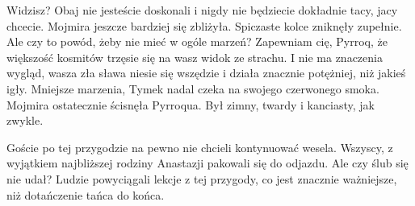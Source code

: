 \ds{} Widzisz? Obaj nie jesteście doskonali i nigdy nie będziecie dokładnie tacy, jacy chcecie. \dm{} Mojmira jeszcze bardziej się zbliżyła.
Spiczaste kolce zniknęły zupełnie. \dm{} Ale czy to powód, żeby nie mieć w ogóle marzeń?
Zapewniam cię, Pyrroq, że większość kosmitów trzęsie się na wasz widok ze strachu. I nie ma znaczenia wygląd, wasza zła sława niesie się wszędzie i działa znacznie potężniej, niż jakieś igły.
Mniejsze marzenia, Tymek nadal czeka na swojego czerwonego smoka.
\dm{} Mojmira ostatecznie ścisnęła Pyrroqua. 
Był zimny, twardy i kanciasty, jak zwykle. \de{}

Goście po tej przygodzie na pewno nie chcieli kontynuować wesela. 
Wszyscy, z wyjątkiem najbliższej rodziny Anastazji pakowali się do odjazdu.
Ale czy ślub się nie udał? Ludzie powyciągali lekcje z tej przygody, co jest znacznie ważniejsze, niż dotańczenie tańca do końca.















